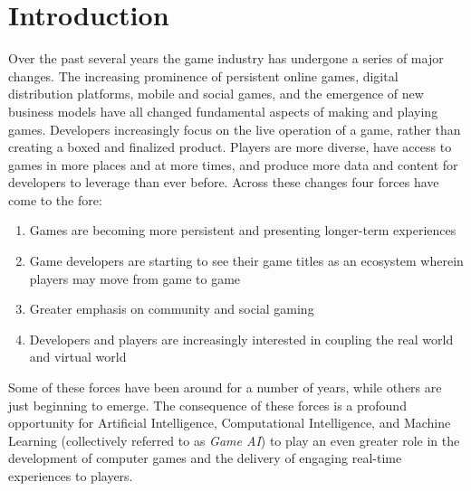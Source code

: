 \documentclass[conference]{IEEEtran}
\begin{document}

\section{Introduction}
Over the past several years the game industry has undergone a series of major changes. 
The increasing prominence of persistent online games, digital distribution platforms, mobile and social games, and the emergence of new business models have all changed fundamental aspects of making and playing games. 
Developers increasingly focus on the live operation of a game, rather than creating a boxed and finalized product.
Players are more diverse, have access to games in more places and at more times, and produce more data and content for developers to leverage than ever before. Across these changes four forces have come to the fore:
\begin{enumerate}
\item Games are becoming more persistent and presenting longer-term experiences %
\item Game developers are starting to see their game titles as an ecosystem wherein players may move from game to game %
\item Greater emphasis on community and social gaming %
\item Developers and players are increasingly interested in coupling the real world and virtual world %
\end{enumerate}
\noindent
Some of these forces have been around for a number of years, while others are just beginning to emerge.
The consequence of these forces is a profound opportunity for Artificial Intelligence, Computational Intelligence, and Machine Learning (collectively referred to as {\em Game AI}) to play an even greater role in the development of computer games and the delivery of engaging real-time experiences to players. 
\end{document}
